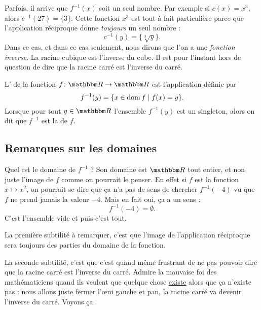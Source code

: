 Parfois, il arrive que $f^{-1}(x)$ soit un seul nombre. Par exemple si $c(x)=x^3$, alors $c^{-1}(27)=\{ 3 \}$. Cette fonction $x^3$ est tout à fait particulière parce que l'application réciproque donne \emph{toujours} un seul nombre :
\[ 
  c^{-1}(y)=\{ \sqrt[3]{y} \}.
\]
Dans ce cas, et dans ce cas seulement, nous dirons que l'on a une \emph{fonction inverse}. La racine cubique est l'inverse du cube. Il est pour l'instant hors de question de dire que la racine carré est l'inverse du carré.

\begin{definition}
L' de la fonction $f\colon \eR\to \eR$ est l'application définie par
\[ 
  f^{-1}(y)=\{ x\in\operatorname{dom} f\mid f(x)=y \}.
\]
Lorsque pour tout $y\in\eR$ l'ensemble $f^{-1}(y)$ est un singleton, alors on dit que $f^{-1}$ est la  de $f$.
\end{definition}

\subsection{Remarques sur les domaines}

Quel est le domaine de $f^{-1}$ ? Son domaine est $\eR$ tout entier, et non juste l'image de $f$ comme on pourrait le penser. En effet si $f$ est la fonction $x\mapsto x^2$, on pourrait se dire que ça n'a pas de sens de chercher $f^{-1}(-4)$ vu que $f$ ne prend jamais la valeur $-4$. Mais en fait oui, ça a un sens :
\[ 
  f^{-1}(-4)=\emptyset.
\]
C'est l'ensemble vide et puis c'est tout.

La première subtilité à remarquer, c'est que l'image de l'application réciproque sera toujours des parties du domaine de la fonction.

La seconde subtilité, c'est que c'est quand même frustrant de ne pas pouvoir dire que la racine carré est l'inverse du carré. Admire la mauvaise foi des mathématiciens quand ils veulent que quelque chose \href{http://fr.wikipedia.org/wiki/Existentialisme}{existe} alors que ça n'existe pas : nous allons juste fermer l'\oe ui gauche et pan, la racine carré va devenir l'inverse du carré. Voyons ça.

